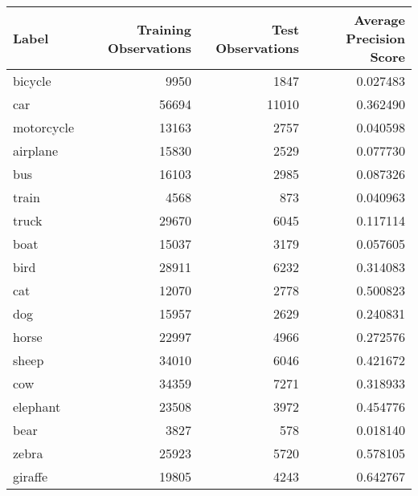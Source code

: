 \begin{tabular}{lrrr}
\toprule
      Label &  Training Observations &  Test Observations &  Average Precision Score \\
\midrule
    bicycle &                   9950 &               1847 &                 0.027483 \\
        car &                  56694 &              11010 &                 0.362490 \\
 motorcycle &                  13163 &               2757 &                 0.040598 \\
   airplane &                  15830 &               2529 &                 0.077730 \\
        bus &                  16103 &               2985 &                 0.087326 \\
      train &                   4568 &                873 &                 0.040963 \\
      truck &                  29670 &               6045 &                 0.117114 \\
       boat &                  15037 &               3179 &                 0.057605 \\
       bird &                  28911 &               6232 &                 0.314083 \\
        cat &                  12070 &               2778 &                 0.500823 \\
        dog &                  15957 &               2629 &                 0.240831 \\
      horse &                  22997 &               4966 &                 0.272576 \\
      sheep &                  34010 &               6046 &                 0.421672 \\
        cow &                  34359 &               7271 &                 0.318933 \\
   elephant &                  23508 &               3972 &                 0.454776 \\
       bear &                   3827 &                578 &                 0.018140 \\
      zebra &                  25923 &               5720 &                 0.578105 \\
    giraffe &                  19805 &               4243 &                 0.642767 \\
\bottomrule
\end{tabular}
